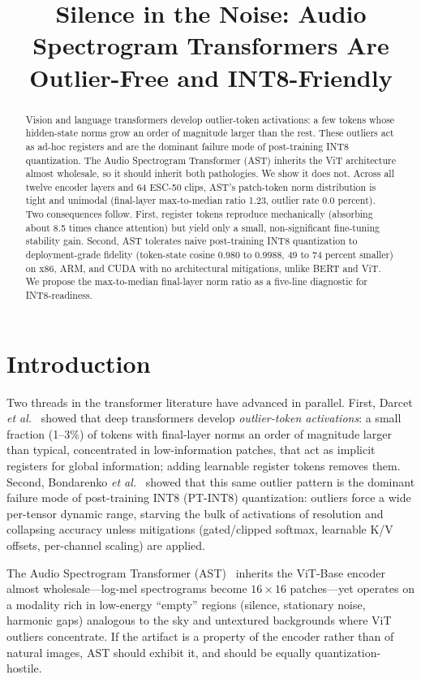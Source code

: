 \documentclass{Interspeech2024}
\title{Silence in the Noise: Audio Spectrogram Transformers Are Outlier-Free and INT8-Friendly}
\begin{document}
\maketitle

\begin{abstract}
Vision and language transformers develop outlier-token activations: a few tokens whose hidden-state norms grow an order of magnitude larger than the rest. These outliers act as ad-hoc registers and are the dominant failure mode of post-training INT8 quantization. The Audio Spectrogram Transformer (AST) inherits the ViT architecture almost wholesale, so it should inherit both pathologies. We show it does not. Across all twelve encoder layers and 64 ESC-50 clips, AST's patch-token norm distribution is tight and unimodal (final-layer max-to-median ratio 1.23, outlier rate 0.0 percent). Two consequences follow. First, register tokens reproduce mechanically (absorbing about 8.5 times chance attention) but yield only a small, non-significant fine-tuning stability gain. Second, AST tolerates naive post-training INT8 quantization to deployment-grade fidelity (token-state cosine 0.980 to 0.9988, 49 to 74 percent smaller) on x86, ARM, and CUDA with no architectural mitigations, unlike BERT and ViT. We propose the max-to-median final-layer norm ratio as a five-line diagnostic for INT8-readiness.
\end{abstract}

\section{Introduction}
Two threads in the transformer literature have advanced in parallel. First, Darcet \emph{et al.}~\cite{darcet2024need} showed that deep transformers develop \emph{outlier-token activations}: a small fraction (1--3\%) of tokens with final-layer norms an order of magnitude larger than typical, concentrated in low-information patches, that act as implicit registers for global information; adding learnable register tokens removes them. Second, Bondarenko \emph{et al.}~\cite{bondarenko2023quantizable} showed that this same outlier pattern is the dominant failure mode of post-training INT8 (PT-INT8) quantization: outliers force a wide per-tensor dynamic range, starving the bulk of activations of resolution and collapsing accuracy unless mitigations (gated/clipped softmax, learnable K/V offsets, per-channel scaling) are applied.

The Audio Spectrogram Transformer (AST)~\cite{gong2021ast} inherits the ViT-Base encoder~\cite{dosovitskiy2021image} almost wholesale---log-mel spectrograms become $16\times16$ patches---yet operates on a modality rich in low-energy ``empty'' regions (silence, stationary noise, harmonic gaps) analogous to the sky and untextured backgrounds where ViT outliers concentrate. If the artifact is a property of the encoder rather than of natural images, AST should exhibit it, and should be equally quantization-hostile.
\end{document}

